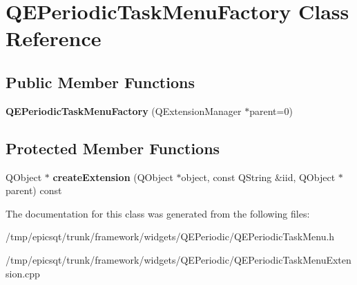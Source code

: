 \hypertarget{classQEPeriodicTaskMenuFactory}{
\section{QEPeriodicTaskMenuFactory Class Reference}
\label{classQEPeriodicTaskMenuFactory}
}
\subsection*{Public Member Functions}
\begin{DoxyCompactItemize}
\item 
\hypertarget{classQEPeriodicTaskMenuFactory_a91ad266046331f93ddc11ed0fdc499e4}{
{\bfseries QEPeriodicTaskMenuFactory} (QExtensionManager $\ast$parent=0)}
\label{classQEPeriodicTaskMenuFactory_a91ad266046331f93ddc11ed0fdc499e4}

\end{DoxyCompactItemize}
\subsection*{Protected Member Functions}
\begin{DoxyCompactItemize}
\item 
\hypertarget{classQEPeriodicTaskMenuFactory_a00ea806f56082661212df764e3a84993}{
QObject $\ast$ {\bfseries createExtension} (QObject $\ast$object, const QString \&iid, QObject $\ast$parent) const }
\label{classQEPeriodicTaskMenuFactory_a00ea806f56082661212df764e3a84993}

\end{DoxyCompactItemize}


The documentation for this class was generated from the following files:\begin{DoxyCompactItemize}
\item 
/tmp/epicsqt/trunk/framework/widgets/QEPeriodic/QEPeriodicTaskMenu.h\item 
/tmp/epicsqt/trunk/framework/widgets/QEPeriodic/QEPeriodicTaskMenuExtension.cpp\end{DoxyCompactItemize}
